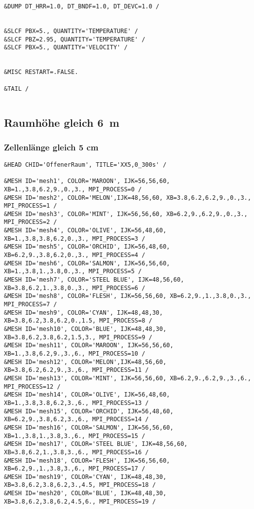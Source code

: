 \begin{lstlisting}[emptylines=0,basicstyle=\tiny]
&DUMP DT_HRR=1.0, DT_BNDF=1.0, DT_DEVC=1.0 /


&SLCF PBX=5., QUANTITY='TEMPERATURE' /
&SLCF PBZ=2.95, QUANTITY='TEMPERATURE' /
&SLCF PBX=5., QUANTITY='VELOCITY' /


&MISC RESTART=.FALSE.

&TAIL /


\end{lstlisting}

\subsection*{Raumhöhe gleich 6~m}
\subsubsection{Zellenlänge gleich 5 cm}
\begin{lstlisting}[emptylines=0,basicstyle=\tiny]
&HEAD CHID='OffenerRaum', TITLE='XX5,0_300s' /

&MESH ID='mesh1', COLOR='MAROON', IJK=56,56,60, XB=1.,3.8,6.2,9.,0.,3., MPI_PROCESS=0 /
&MESH ID='mesh2', COLOR='MELON',IJK=48,56,60, XB=3.8,6.2,6.2,9.,0.,3., MPI_PROCESS=1 /
&MESH ID='mesh3', COLOR='MINT', IJK=56,56,60, XB=6.2,9.,6.2,9.,0.,3., MPI_PROCESS=2 /
&MESH ID='mesh4', COLOR='OLIVE', IJK=56,48,60, XB=1.,3.8,3.8,6.2,0.,3., MPI_PROCESS=3 /
&MESH ID='mesh5', COLOR='ORCHID', IJK=56,48,60, XB=6.2,9.,3.8,6.2,0.,3., MPI_PROCESS=4 /
&MESH ID='mesh6', COLOR='SALMON', IJK=56,56,60, XB=1.,3.8,1.,3.8,0.,3., MPI_PROCESS=5 /
&MESH ID='mesh7', COLOR='STEEL BLUE', IJK=48,56,60, XB=3.8,6.2,1.,3.8,0.,3., MPI_PROCESS=6 /
&MESH ID='mesh8', COLOR='FLESH', IJK=56,56,60, XB=6.2,9.,1.,3.8,0.,3., MPI_PROCESS=7 /
&MESH ID='mesh9', COLOR='CYAN', IJK=48,48,30, XB=3.8,6.2,3.8,6.2,0.,1.5, MPI_PROCESS=8 /
&MESH ID='mesh10', COLOR='BLUE', IJK=48,48,30, XB=3.8,6.2,3.8,6.2,1.5,3., MPI_PROCESS=9 /
&MESH ID='mesh11', COLOR='MAROON', IJK=56,56,60, XB=1.,3.8,6.2,9.,3.,6., MPI_PROCESS=10 /
&MESH ID='mesh12', COLOR='MELON',IJK=48,56,60, XB=3.8,6.2,6.2,9.,3.,6., MPI_PROCESS=11 /
&MESH ID='mesh13', COLOR='MINT', IJK=56,56,60, XB=6.2,9.,6.2,9.,3.,6., MPI_PROCESS=12 /
&MESH ID='mesh14', COLOR='OLIVE', IJK=56,48,60, XB=1.,3.8,3.8,6.2,3.,6., MPI_PROCESS=13 /
&MESH ID='mesh15', COLOR='ORCHID', IJK=56,48,60, XB=6.2,9.,3.8,6.2,3.,6., MPI_PROCESS=14 /
&MESH ID='mesh16', COLOR='SALMON', IJK=56,56,60, XB=1.,3.8,1.,3.8,3.,6., MPI_PROCESS=15 /
&MESH ID='mesh17', COLOR='STEEL BLUE', IJK=48,56,60, XB=3.8,6.2,1.,3.8,3.,6., MPI_PROCESS=16 /
&MESH ID='mesh18', COLOR='FLESH', IJK=56,56,60, XB=6.2,9.,1.,3.8,3.,6., MPI_PROCESS=17 /
&MESH ID='mesh19', COLOR='CYAN', IJK=48,48,30, XB=3.8,6.2,3.8,6.2,3.,4.5, MPI_PROCESS=18 /
&MESH ID='mesh20', COLOR='BLUE', IJK=48,48,30, XB=3.8,6.2,3.8,6.2,4.5,6., MPI_PROCESS=19 /


\end{lstlisting}

